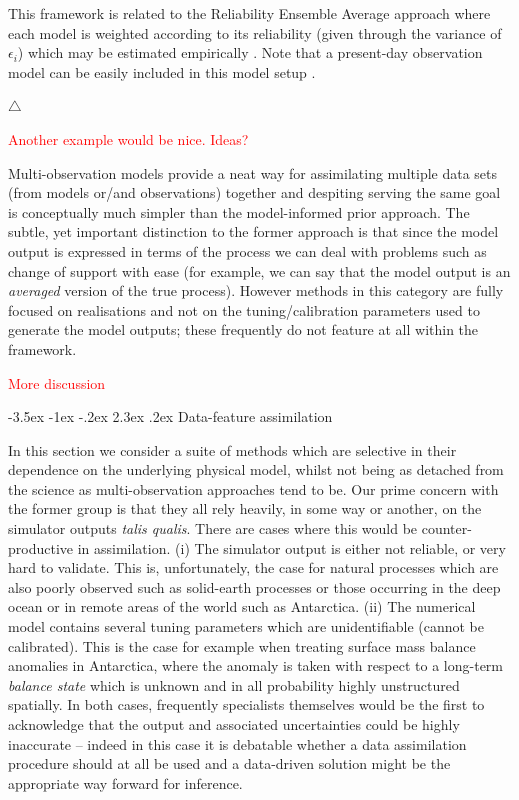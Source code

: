 \documentclass[10pt,a4paper]{article}
\makeatletter
\newcommand\xqed[1]{%
  \leavevmode\unskip\penalty9999 \hbox{}\nobreak\hfill
  \quad\hbox{#1}}
\newcommand\demo{\xqed{$\triangle$}}
\newcommand{\red}{\textcolor{red}}
\renewcommand\section{\@startsection{section}{1}{\z@}%
                                  {-3.5ex \@plus -1ex \@minus -.2ex}%
                                  {2.3ex \@plus.2ex}%
                                  {\normalfont\large\bfseries}}
\makeatother
\begin{document}
\noindent This framework is related to the Reliability Ensemble Average approach where each model is weighted according to its reliability (given through the variance of $\epsilon_i$) which may be estimated empirically \citep{Giorgi_2002}. Note that a present-day observation model can be easily included in this model setup \citep[see also][]{Smith_2009,Tebaldi_2007}. 

\demo


\red{Another example would be nice. Ideas?}

Multi-observation models provide a neat way for assimilating multiple data sets (from models or/and observations) together and despiting serving the same goal is conceptually much simpler than the model-informed prior approach. The subtle, yet important distinction to the former approach is that since the model output is expressed in terms of the process we can deal with problems such as change of support with ease (for example, we can say that the model output is an \emph{averaged} version of the true process). However methods in this category are fully focused on realisations and not on the tuning/calibration parameters used to generate the model outputs; these frequently do not feature at all within the framework.  

\red{More discussion}


\section{Data-feature assimilation}

In this section we consider a suite of methods which are selective in their dependence on the underlying physical model, whilst not being as detached from the science as multi-observation approaches tend to be. Our prime concern with the former group is that they all rely heavily, in some way or another, on the simulator outputs \emph{talis qualis}. There are cases where this would be counter-productive in assimilation. (i) The simulator output is either not reliable, or very hard to validate. This is, unfortunately, the case for natural processes which are also poorly observed such as solid-earth processes or those occurring in the deep ocean or in remote areas of the world such as Antarctica. (ii) The numerical model contains several tuning parameters which are unidentifiable (cannot be calibrated). This is the case for example when treating surface mass balance anomalies in Antarctica, where the anomaly is taken with respect to a long-term \emph{balance state} which is unknown and in all probability highly unstructured spatially. In both cases, frequently specialists themselves would be the first to acknowledge that the output and associated uncertainties could be highly inaccurate -- indeed in this case it is debatable whether a data assimilation procedure should at all be used and a data-driven solution might be the appropriate way forward for inference. 
\end{document}
